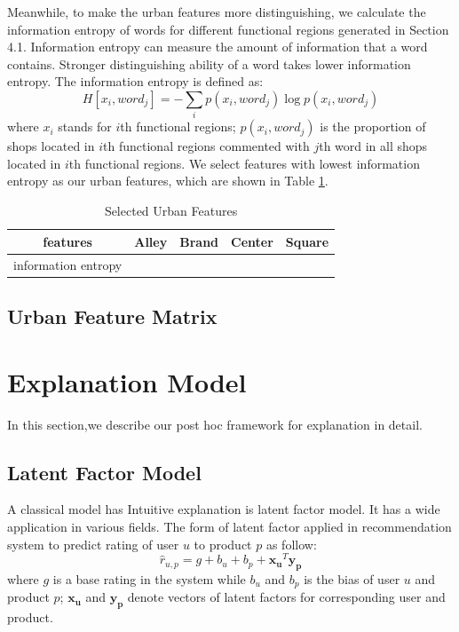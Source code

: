 \documentclass[runningheads]{llncs}
\begin{document}
Meanwhile, to make the urban features more distinguishing, we calculate the information entropy of words for different functional regions generated in Section 4.1.
Information entropy can measure the amount of information that a word contains.
Stronger distinguishing ability of a word takes lower information entropy.
The information entropy is defined as:
$$H[x_i,word_j] = -\sum_i p(x_i,word_j)\log p(x_i,word_j)$$
where $x_i$ stands for $i$th functional regions;
$p(x_i,word_j)$ is the proportion of shops located in $i$th functional regions commented with $j$th word in all shops located in $i$th functional regions.
We select features with lowest information entropy as our urban features, which are shown in Table \ref{urbanfeatures}.

\begin{table}[h]
\centering
\caption{Selected Urban Features}
\label{urbanfeatures}
\begin{tabular}{c|c|c|c|c}
\hline
features &  Alley & Brand & Center & Square\\
\hline
information entropy &  &  &  & \\
\hline
\end{tabular}
\end{table}


\subsection{Urban Feature Matrix}


\section{Explanation Model}\label{sec:regression}
In this section,we describe our post hoc framework for explanation in detail.

\subsection{Latent Factor Model}
A classical model has Intuitive explanation is latent factor model.
It has a wide application in various fields.
The form of latent factor applied in recommendation system to predict rating of user $u$ to product $p$ as follow:
\begin{equation}
\hat{r}_{u,p}= g+b_u+b_p+\bm{x_u}^T\bm{y_p} \label{basic}
\end{equation}
where $g$ is a base rating in the system while $b_u$ and $b_p$ is the bias of user $u$ and product $p$;
$\bm{x_u}$ and $\bm{y_p}$ denote vectors of latent factors for corresponding user and product.
\end{document}
